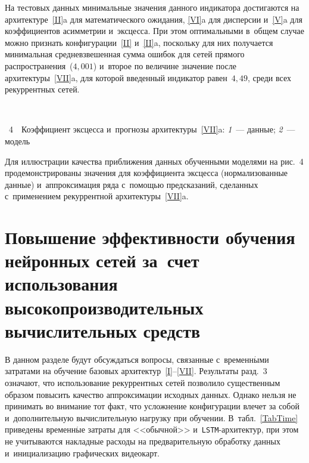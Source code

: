 \begin{multicols}{2}
 На тестовых данных минимальные значения данного индикатора достигаются на 
 архитектуре~\ref{II}{a} для математического ожидания, \ref{VI}{a} 
 для дисперсии и~\ref{V}{a} для коэффициентов асимметрии и~эксцесса. 
 При этом оптимальными в~общем случае можно признать конфигурации~\ref{II} 
 и~\ref{II}{a}, поскольку для них получается минимальная средневзвешенная
  сумма ошибок для сетей прямого распространения~($4{,}001$) 
  и~второе по величине значение после архитектуры~\ref{VII}{a}, 
  для которой введенный индикатор равен~$4{,}49$, среди всех рекуррентных сетей.
  
    { \begin{center}  %
 \vspace*{-4pt}
   \mbox{%
 \epsfxsize=78.945mm 
 }


\end{center}


\noindent
{{\figurename~4}\ \ \small{Коэффициент эксцесса и~прогнозы архитектуры~\ref{VII}{a}:
\textit{1}~--- данные; \textit{2}~--- модель}}
}

\vspace*{15pt}




Для иллюстрации качества приближения данных обученными моделями 
на рис.~4 продемонстрированы значения для коэффициента 
эксцесса (нормализованные данные) и~аппроксимация ряда с~помощью предсказаний, 
сделанных с~применением рекуррентной архитектуры~\ref{VII}{a}.


\section{Повышение эффективности обучения нейронных сетей за~счет 
использования высокопроизводительных вычислительных средств}

В данном разделе будут обсуждаться вопросы, связанные с~временн$\acute{\mbox{ы}}$ми 
затратами на обучение базовых архитектур~\ref{I}--\ref{VII}. 
Результаты разд.~3 означают, что использование рекуррентных сетей позволило 
существенным образом повысить качество аппроксимации исходных данных. 
Однако нельзя не принимать во внимание тот факт, что усложнение конфигурации 
влечет за собой и~дополнительную вычислительную нагрузку при обучении. 
В~табл.~\ref{TabTime} приведены временн$\acute{\mbox{ы}}$е затраты для <<обычной>> 
и~\verb"LSTM"-ар\-хи\-тек\-тур, при этом не учитываются накладные расходы 
на предварительную обработку данных и~инициализацию графических видеокарт. 




\end{multicols}

